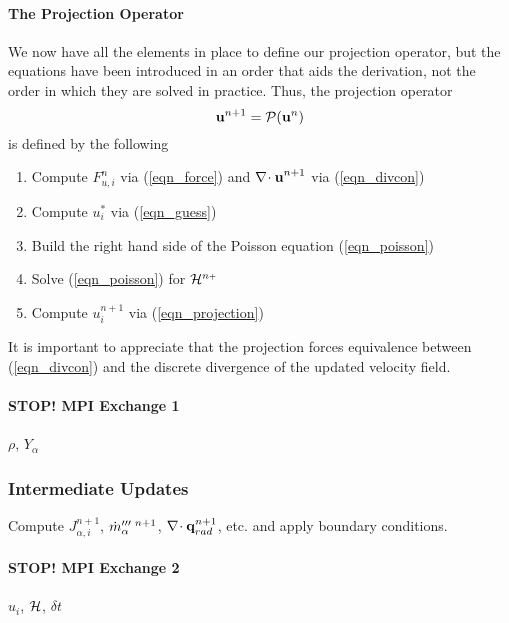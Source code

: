 \documentclass[11pt]{article}
\begin{document}
\paragraph{The Projection Operator} We now have all the elements in place to define our projection operator, but the equations have been introduced in an order that aids the derivation, not the order in which they are solved in practice.  Thus, the projection operator
\begin{equation}
\mathbf{u}^{n+1} = {\cal P}(\mathbf{u}^n)
\end{equation}
is defined by the following
\begin{enumerate}
\item Compute $F_{u,i}^n$ via (\ref{eqn_force}) and ${\nabla\!\cdot \mathbf{u}}^{n+1}$ via (\ref{eqn_divcon})
\item Compute $u_i^*$ via (\ref{eqn_guess})
\item Build the right hand side of the Poisson equation (\ref{eqn_poisson})
\item Solve (\ref{eqn_poisson}) for ${\cal H}^{n{\scriptscriptstyle +}}$
\item Compute $u_i^{n+1}$ via (\ref{eqn_projection})
\end{enumerate}
It is important to appreciate that the projection forces equivalence between (\ref{eqn_divcon}) and the discrete divergence of the updated velocity field. 


\paragraph{STOP! MPI Exchange 1} $\rho$, $Y_\alpha$

\subsubsection{Intermediate Updates}

Compute $J_{\alpha,i}^{n+1}$, $\dot{m}_\alpha^{{\prime\prime\prime} \,\,n+1}$, $\nabla\!\cdot \mathbf{q}_{rad}^{n+1}$, etc. and apply boundary conditions.

\paragraph{STOP! MPI Exchange 2} $u_i$, $\cal H$, $\delta t$
\end{document}
